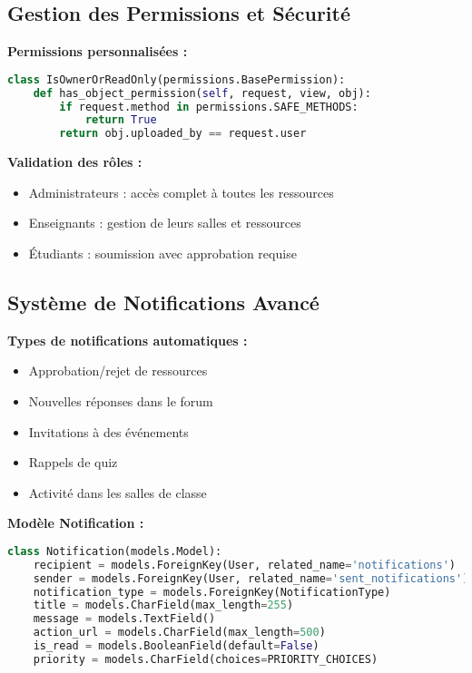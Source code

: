 \documentclass[12pt,a4paper]{article}
\begin{document}
\subsection{Gestion des Permissions et Sécurité}

\textbf{Permissions personnalisées :}
\begin{lstlisting}[language=Python]
class IsOwnerOrReadOnly(permissions.BasePermission):
    def has_object_permission(self, request, view, obj):
        if request.method in permissions.SAFE_METHODS:
            return True
        return obj.uploaded_by == request.user
\end{lstlisting}

\textbf{Validation des rôles :}
\begin{itemize}
    \item Administrateurs : accès complet à toutes les ressources
    \item Enseignants : gestion de leurs salles et ressources
    \item Étudiants : soumission avec approbation requise
\end{itemize}

\subsection{Système de Notifications Avancé}

\textbf{Types de notifications automatiques :}
\begin{itemize}
    \item Approbation/rejet de ressources
    \item Nouvelles réponses dans le forum
    \item Invitations à des événements
    \item Rappels de quiz
    \item Activité dans les salles de classe
\end{itemize}

\textbf{Modèle Notification :}
\begin{lstlisting}[language=Python]
class Notification(models.Model):
    recipient = models.ForeignKey(User, related_name='notifications')
    sender = models.ForeignKey(User, related_name='sent_notifications')
    notification_type = models.ForeignKey(NotificationType)
    title = models.CharField(max_length=255)
    message = models.TextField()
    action_url = models.CharField(max_length=500)
    is_read = models.BooleanField(default=False)
    priority = models.CharField(choices=PRIORITY_CHOICES)
\end{lstlisting}
\end{document}
